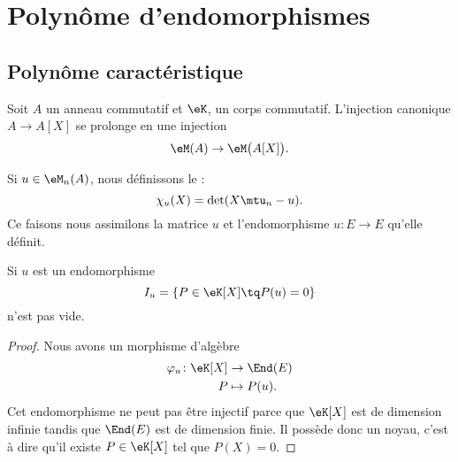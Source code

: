 
\section{Polynôme d'endomorphismes}

\subsection{Polynôme caractéristique}

Soit \( A\) un anneau commutatif et \( \eK\), un corps commutatif. L'injection canonique \( A\to A[X]\) se prolonge en une injection
\begin{equation}
   \eM(A)\to\eM\big( A[X] \big).
\end{equation}

\begin{definition}  \label{DefOWQooXbybYD}
    Si \( u\in\eM_n(A)\), nous définissons le  :
    \begin{equation}    \label{Eqkxbdfu}
        \chi_u(X)=\det(X\mtu_n-u).
    \end{equation} 
    Ce faisons nous assimilons la matrice \( u\) et l'endomorphisme \( u\colon E\to E\) qu'elle définit. 
\end{definition}

\begin{lemma}
    Si \( u\) est un endomorphisme
    \begin{equation}
        I_u=\{ P\in \eK[X] \tq P(u)=0\}
    \end{equation}
    n'est pas vide.
\end{lemma}

\begin{proof}
    Nous avons un morphisme d'algèbre
    \begin{equation}
        \begin{aligned}
            \varphi_u\colon\eK[X]&\to \End(E) \\
            P&\mapsto P(u). 
        \end{aligned}
    \end{equation}
    Cet endomorphisme ne peut pas être injectif parce que \(\eK[X]\) est de dimension infinie tandis que \( \End(E)\) est de dimension finie. Il possède donc un noyau, c'est à dire qu'il existe \( P\in\eK[X]\) tel que \( P(X)=0\).
\end{proof}

